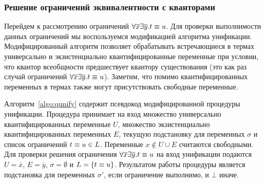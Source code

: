 \subsubsection{Решение ограничений эквивалентности с кванторами}

\label{sec:negation-qunify}

Перейдем к рассмотрению ограничений $\forall{\overline{x}}\exists{\overline{y}}.t \equiv u$.
Для проверки выполнимости данных ограничений 
мы воспользуемся модификацией алгоритма унификации\cite{liu1999constructive}.
Модифицированный алгоритм позволяет обрабатывать 
встречающиеся в термах универсально и экзистенциально квантифицированные переменные
при условии, что квантор всеобщности предшествует квантору существования
(это как раз случай ограничений $\forall{\overline{x}}\exists{\overline{y}}.t \equiv u$).
Заметим, что помимо квантифицированных переменных в термах также могут 
присутствовать свободные переменные.

Алгоритм~\ref{algo:qunify} содержит псевдокод модифицированной процедуры унификации.
Процедура принимает на вход множество универсально квантифицированных переменные $U$,
множество экзистенциально квантифицированных переменных $E$,
текущую подстановку для переменных $\sigma$ и
список ограничений $t \equiv u \in L$.
Переменные $x \not\in U \cup E$ считаются свободными.
Для проверки решения ограничения $\forall{\overline{x}}\exists{\overline{y}}.t \equiv u$ 
на вход унификации подаются $U = \overline{x}$, 
$E = \overline{y}$, $\sigma = \emptyset$ и $L = \{t \equiv u\}$.
Результатом работы процедуры является подстановка для переменных $\sigma'$,
если ограничение выполнимо, и $\bot$ иначе.

